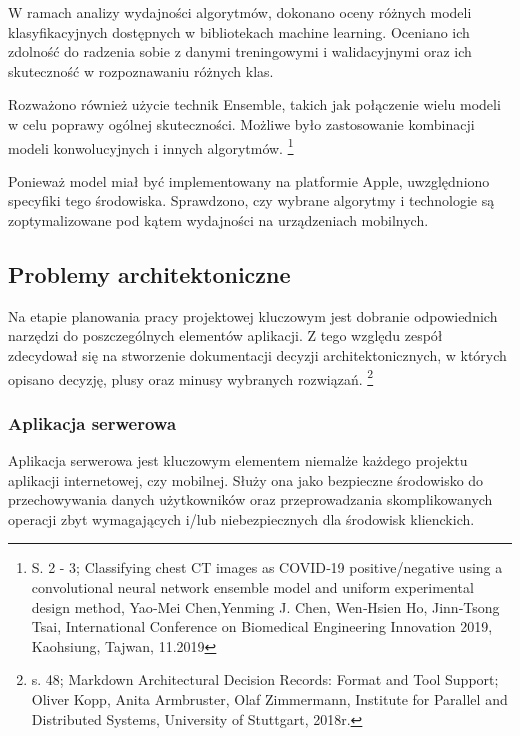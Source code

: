 \documentclass[12pt, a4paper, twoside, openany]{book}
\newcommand{\forceindent}{\leavevmode{\parindent=1.3em\indent}}
\begin{document}
W ramach analizy wydajności algorytmów, dokonano oceny różnych modeli klasyfikacyjnych dostępnych w bibliotekach machine learning.
Oceniano ich zdolność do radzenia sobie z danymi treningowymi i walidacyjnymi oraz ich skuteczność w rozpoznawaniu różnych klas.

Rozważono również użycie technik Ensemble, takich jak połączenie wielu modeli w celu poprawy ogólnej skuteczności.
Możliwe było zastosowanie kombinacji modeli konwolucyjnych i innych algorytmów. \footnote{ S. 2 - 3; Classifying chest CT images as COVID‑19 positive/negative using a convolutional neural network ensemble model and uniform experimental design method, Yao‑Mei Chen,Yenming J. Chen, Wen‑Hsien Ho, Jinn‑Tsong Tsai, International Conference on Biomedical Engineering Innovation 2019, Kaohsiung, Tajwan, 11.2019}

Ponieważ model miał być implementowany na platformie Apple, uwzględniono specyfiki tego środowiska.
Sprawdzono, czy wybrane algorytmy i technologie są zoptymalizowane pod kątem wydajności na urządzeniach 
mobilnych.

\subsection{Problemy architektoniczne}

\forceindent Na etapie planowania pracy projektowej kluczowym jest dobranie odpowiednich narzędzi
do poszczególnych elementów aplikacji. Z tego względu zespół zdecydował się na stworzenie
dokumentacji decyzji architektonicznych, w których opisano decyzję, plusy oraz minusy wybranych rozwiązań. \footnote{s. 48; Markdown Architectural Decision Records: Format and Tool Support; Oliver Kopp, Anita Armbruster, Olaf Zimmermann, Institute for Parallel and Distributed Systems, University of Stuttgart, 2018r.}

\subsubsection{Aplikacja serwerowa}

\forceindent Aplikacja serwerowa jest kluczowym elementem niemalże każdego projektu aplikacji
internetowej, czy mobilnej. Służy ona jako bezpieczne środowisko do przechowywania danych
użytkowników oraz przeprowadzania skomplikowanych operacji zbyt wymagających i/lub
niebezpiecznych dla środowisk klienckich.
\end{document}
